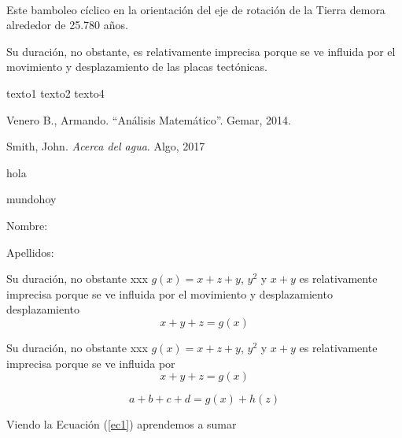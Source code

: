 \documentclass[12pt,a4paper]{article}
\begin{document}
\ \\[2cm]

\begin{minipage}{5cm}
Este bamboleo cíclico en la orientación del eje de rotación de la Tierra demora alrededor de 25.780 años. 

Su duración, no obstante, es relativamente imprecisa porque se ve influida por el movimiento y desplazamiento 
de las placas tectónicas.
\end{minipage}

texto1 texto2  texto4  


\begin{thebibliography}{99}
	 Venero B., Armando. ``Análisis Matemático''. Gemar, 2014.
	
	 Smith, John. \emph{Acerca del agua}. Algo, 2017
\end{thebibliography}

\newpage
hola

\vfill

mundo\hfill hoy

Nombre:\hrulefill

Apellidos:\dotfill

\clearpage


Su duración, no obstante xxx $g(x)=x+z+y$, $y^2$ y $x+y$ es relativamente imprecisa porque se ve influida por el movimiento y desplazamiento desplazamiento
$$
x+y+z=g(x)
$$

Su duración, no obstante xxx $g(x)=x+z+y$, $y^2$ y $x+y$ es relativamente imprecisa porque se ve influida por
$$
x+y+z=g(x)
$$

\begin{equation}\label{ec1}
a+b+c+d=g(x)+h(z)
\end{equation}

Viendo la Ecuación (\ref{ec1}) aprendemos a sumar
\end{document}
